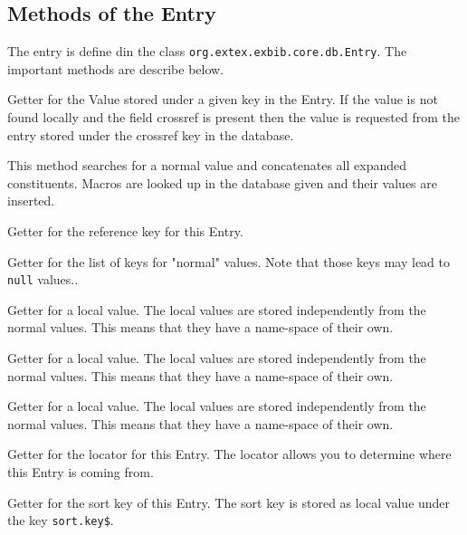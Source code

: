 \subsection{Methods of the Entry}

The entry is define din the class \texttt{org.extex.exbib.core.db.Entry}. 
The important methods are describe below.

\begin{methods}
    Getter for the Value stored under a given key in the Entry. If the
    value is not found locally and the field crossref is present then
    the value is requested from the entry stored under the crossref key
    in the database.

    This method searches for a normal value and concatenates all
    expanded constituents. Macros are looked up in the database given and
    their values are inserted.

    Getter for the reference key for this Entry.

    Getter for the list of keys for "normal" values. Note that those keys may
    lead to \texttt{null} values..

    Getter for a local value. The local values are stored independently from
    the normal values. This means that they have a name-space of their own.

    Getter for a local value. The local values are stored independently from
    the normal values. This means that they have a name-space of their own.

    Getter for a local value. The local values are stored independently from
    the normal values. This means that they have a name-space of their own.

    Getter for the locator for this Entry. The locator allows you to
    determine where this Entry is coming from.

    Getter for the sort key of this Entry. The sort key is stored as local
    value under the key \texttt{sort.key\$}.


\end{methods}
